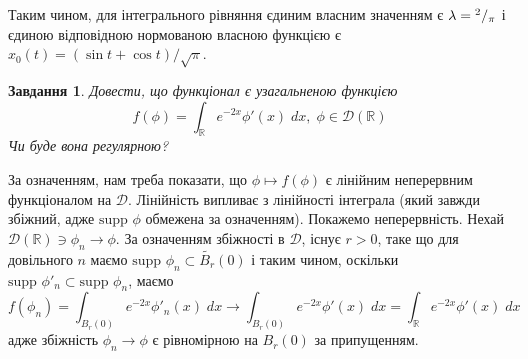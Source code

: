 \documentclass[10pt]{article}
\newtheorem{prob}{Завдання}
\newcommand{\dx}{\;dx}
\begin{document}
	Таким чином, для інтегрального рівняння єдиним власним значенням є $\lambda={^{2}/_{\pi}}$ і єдиною відповідною нормованою
	власною функцією є $x_0(t)=(\sin t+\cos t)/\sqrt{\pi}$.
\begin{prob}
	Довести, що функціонал є узагальненою функцією	\[f(\phi)=\int_{\mathbb{R}}e^{-2x}\phi'(x)\dx,\;\phi\in\mathcal{D}(\mathbb{R})\]
	Чи буде вона регулярною?
\end{prob}
\newcommand{\supp}{\mbox{supp }}
За означенням, нам треба показати, що $\phi\mapsto f(\phi)$ є лінійним неперервним функціоналом на $\mathcal{D}$. Лінійність
випливає з лінійності інтеграла (який завжди збіжний, адже $\supp \phi$ обмежена за означенням). Покажемо неперервність.
Нехай $\mathcal{D}(\mathbb{R})\ni\phi_n\to\phi$. За означенням
збіжності в $\mathcal{D}$, існує $r>0$, таке що для довільного
$n$ маємо $\supp\phi_n\subset\widetilde{B_r}(0)$ і таким чином, оскільки $\supp\phi'_n\subset\supp\phi_n$, маємо
\[f(\phi_n)=\int_{B_r(0)}e^{-2x}\phi'_n(x)\dx\to\int_{B_r(0)}e^{-2x}\phi'(x)\dx=\int_{\mathbb{R}}e^{-2x}\phi'(x)\dx\]
адже збіжність $\phi_n\to\phi$ є рівномірною на $B_r(0)$ за припущенням.
\end{document}
